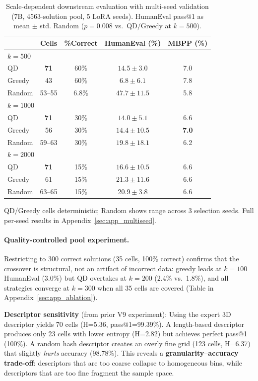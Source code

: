 \documentclass{article}
\begin{document}
\begin{enumerate}[nosep]
\begin{table}[t]
\centering
\caption{Scale-dependent downstream evaluation with multi-seed validation (7B, 4563-solution pool, 5 LoRA seeds). HumanEval pass@1 as mean $\pm$ std. Random ($p{=}0.008$ vs.\ QD/Greedy at $k{=}500$).}
\label{tab:kscale_v10}
\begin{tabular}{lcccc}
\toprule
 & \textbf{Cells} & \textbf{\%Correct} & \textbf{HumanEval (\%)} & \textbf{MBPP (\%)} \\
\midrule
\multicolumn{5}{l}{\textit{$k{=}500$}} \\
QD & \textbf{71} & 60\% & $14.5 \pm 3.0$ & 7.0 \\
Greedy & 43 & 60\% & $6.8 \pm 6.1$ & 7.8 \\
Random & 53--55 & 6.8\% & $\mathbf{47.7 \pm 11.5}$ & 5.8 \\
\midrule
\multicolumn{5}{l}{\textit{$k{=}1000$}} \\
QD & \textbf{71} & 30\% & $14.0 \pm 5.1$ & 6.6 \\
Greedy & 56 & 30\% & $14.4 \pm 10.5$ & \textbf{7.0} \\
Random & 59--63 & 30\% & $\mathbf{19.8 \pm 18.1}$ & 6.2 \\
\midrule
\multicolumn{5}{l}{\textit{$k{=}2000$}} \\
QD & \textbf{71} & 15\% & $16.6 \pm 10.5$ & 6.6 \\
Greedy & 61 & 15\% & $\mathbf{21.3 \pm 11.6}$ & 6.6 \\
Random & 63--65 & 15\% & $20.9 \pm 3.8$ & 6.6 \\
\bottomrule
\end{tabular}
\vspace{1mm}
{\small QD/Greedy cells deterministic; Random shows range across 3 selection seeds. Full per-seed results in Appendix~\ref{sec:app_multiseed}.}
\end{table}

\paragraph{Quality-controlled pool experiment.}
Restricting to 300 correct solutions (35 cells, 100\% correct) confirms that the crossover is structural, not an artifact of incorrect data: greedy leads at $k{=}100$ HumanEval (3.0\%) but QD overtakes at $k{=}200$ (2.4\% vs.\ 1.8\%), and all strategies converge at $k{=}300$ when all 35 cells are covered (Table in Appendix~\ref{sec:app_ablation}).

\textbf{Descriptor sensitivity} (from prior V9 experiment): Using the expert 3D descriptor yields 70 cells (H=5.36, pass@1=99.39\%).
A length-based descriptor produces only 23 cells with lower entropy (H=2.82) but achieves perfect pass@1 (100\%).
A random hash descriptor creates an overly fine grid (123 cells, H=6.37) that slightly \emph{hurts} accuracy (98.78\%).
This reveals a \textbf{granularity--accuracy trade-off}: descriptors that are too coarse collapse to homogeneous bins, while descriptors that are too fine fragment the sample space.


\end{enumerate}
\end{document}
